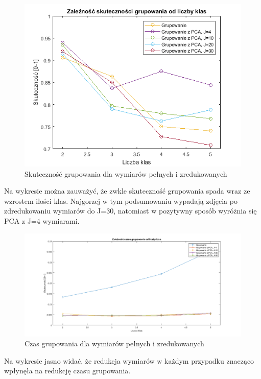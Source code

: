 \begin{figure}[H]
	\centering
	\includegraphics{img/acc_from_classes_group.png}
	\caption{Skuteczność grupowania dla wymiarów pełnych i zredukowanych}  
	\label{rys:acc_from_classes_group} 
\end{figure}

Na wykresie można zauważyć, że zwkle skuteczność grupowania spada wraz ze wzrostem ilości klas. Najgorzej w tym podsumowaniu wypadają zdjęcia po zdredukowaniu wymiarów do J=30, natomiast w pozytywny sposób wyróżnia się PCA z J=4 wymiarami.

\begin{figure}[H]
	\centering
	\hspace*{-0.8in}
	\includegraphics[scale = 0.5]{img/time_from_classes_group.png}
	\caption{Czas grupowania dla wymiarów pełnych i zredukowanych}  
	\label{rys:time_from_classes_group} 
\end{figure}

Na wykresie jasno widać, że redukcja wymiarów w każdym przypadku znacząco wpłynęła na redukcję czasu grupowania.

